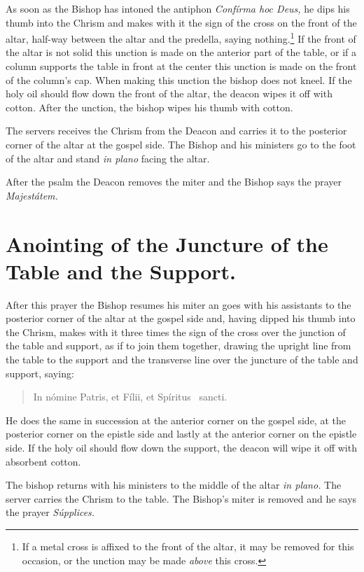 \documentclass[letterpaper]{report}
\begin{document}
{\rubric As soon as the Bishop has intoned the antiphon \textit{Confírma hoc
Deus,} he dips his thumb into the Chrism and makes with it the sign of the
cross on the front of the altar, half-way between the altar and the predella,
saying nothing.\footnote{If a metal cross is affixed to the front of the altar,
it may be removed for this occasion, or the unction may be made \textit{above}
this cross.} If the front of the altar is not solid this unction is made on the
anterior part of the table, or if a column supports the table in front at the
center this unction is made on the front of the column's cap. When making this
unction the bishop does not kneel. If the holy oil should flow down the front
of the altar, the deacon wipes it off with cotton. After the unction, the
bishop wipes his thumb with cotton.

\rubric The servers receives the Chrism from the Deacon and carries it to the
posterior corner of the altar at the gospel side. The Bishop and his ministers
go to the foot of the altar and stand \textit{in plano} facing the altar.

After the psalm the Deacon removes the miter and the Bishop says the prayer
\textit{Majestátem.}

\section{Anointing of the Juncture of the Table and the Support.}

\rubric After this prayer the Bishop resumes his miter an goes with his
assistants to the posterior corner of the altar at the gospel side and, having
dipped his thumb into the Chrism, makes with it three times the sign of the
cross over the junction of the table and support, as if to join them together,
drawing the upright line from the table to the support and the transverse line
over the juncture of the table and support, saying:

\begin{quote}
    In nómine Pa\cross tris, et Fí\cross lii, et Spíritus \cross\ sancti.
\end{quote}

He does the same in succession at the anterior corner on the gospel side, at
the posterior corner on the epistle side and lastly at the anterior corner on
the epistle side. If the holy oil should flow down the support, the deacon will
wipe it off with absorbent cotton.

\rubric The bishop returns with his ministers to the middle of the altar
\textit{in plano.} The server carries the Chrism to the table. The Bishop's
miter is removed and he says the prayer \textit{Súpplices.}

}
\end{document}
